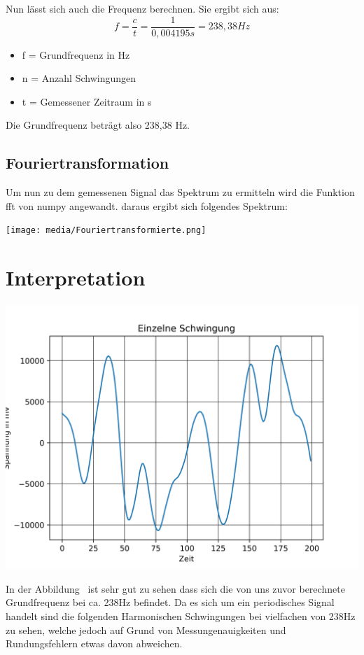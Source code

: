 Nun lässt sich auch die Frequenz berechnen. 
Sie ergibt sich aus:
\begin{equation}
	f =  \frac{c}{t} = \frac{1}{0,004195 s} = 238,38 Hz
\end{equation}
\begin{itemize}
	\item f = Grundfrequenz in Hz 
	\item n = Anzahl Schwingungen
	\item t = Gemessener Zeitraum in s
\end{itemize}

Die Grundfrequenz beträgt also 238,38 Hz.

\subsection*{Fouriertransformation}

Um nun zu dem gemessenen Signal das Spektrum zu ermitteln wird die Funktion fft von numpy angewandt.
daraus ergibt sich folgendes Spektrum:

\texttt{[image: media/Fouriertransformierte.png]}

\section{Interpretation}
\label{chap:VERSUCH_1_INTERPRETATION}


\includegraphics[scale=0.5]{media/singleperiod.png}
\label{fig: Einzelne Schwingung}

In der Abbildung \ ist sehr gut zu sehen dass sich die von uns zuvor berechnete Grundfrequenz
bei ca. 238Hz befindet. Da es sich um ein periodisches Signal handelt sind die folgenden Harmonischen Schwingungen bei vielfachen von 238Hz zu sehen, welche jedoch auf Grund von Messungenauigkeiten und Rundungsfehlern etwas davon abweichen.